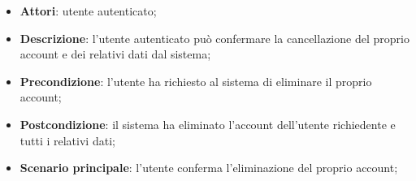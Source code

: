 \begin{itemize}
	\item \textbf{Attori}: utente autenticato;
	\item \textbf{Descrizione}: l'utente autenticato può confermare la cancellazione del proprio account e dei relativi dati dal sistema;
	\item \textbf{Precondizione}: l'utente ha richiesto al sistema di eliminare il proprio account;
	\item \textbf{Postcondizione}: il sistema ha eliminato l'account dell'utente richiedente e tutti i relativi dati;
	\item \textbf{Scenario principale}: l'utente conferma l'eliminazione del proprio account;
\end{itemize}